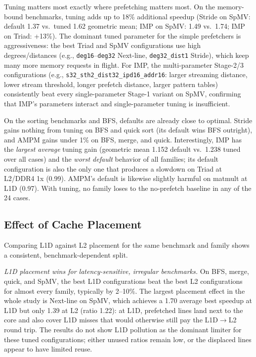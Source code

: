 \documentclass[12pt, letterpaper]{article}
\begin{document}
\noindent Tuning matters most exactly where prefetching matters most. On the memory-bound benchmarks, tuning adds up to 18\% additional speedup (Stride on SpMV: default 1.37 vs.\ tuned 1.62 geometric mean; IMP on SpMV: 1.49 vs.\ 1.74; IMP on Triad: +13\%). The dominant tuned parameter for the simple prefetchers is aggressiveness: the best Triad and SpMV configurations use high degrees/distances (e.g., \texttt{deg16}--\texttt{deg32} Next-line, \texttt{deg32\_dist1} Stride), which keep many more memory requests in flight. For IMP, the multi-parameter Stage-2/3 configurations (e.g., \texttt{s32\_sth2\_dist32\_ipd16\_addr16}: larger streaming distance, lower stream threshold, longer prefetch distance, larger pattern tables) consistently beat every single-parameter Stage-1 variant on SpMV, confirming that IMP's parameters interact and single-parameter tuning is insufficient.

\noindent On the sorting benchmarks and BFS, defaults are already close to optimal. Stride gains nothing from tuning on BFS and quick sort (its default wins BFS outright), and AMPM gains under 1\% on BFS, merge, and quick. Interestingly, IMP has the \emph{largest average} tuning gain (geometric mean 1.152 default vs.\ 1.238 tuned over all cases) and the \emph{worst default} behavior of all families; its default configuration is also the only one that produces a slowdown on Triad at L2/DDR4 1x (0.99). AMPM's default is likewise slightly harmful on matmult at L1D (0.97). With tuning, no family loses to the no-prefetch baseline in any of the 24 cases.

\subsection{Effect of Cache Placement}
\label{sec:res:cache-placement}

Comparing L1D against L2 placement for the same benchmark and family shows a consistent, benchmark-dependent split.

\noindent \emph{L1D placement wins for latency-sensitive, irregular benchmarks.} On BFS, merge, quick, and SpMV, the best L1D configurations beat the best L2 configurations for almost every family, typically by 2--10\%. The largest placement effect in the whole study is Next-line on SpMV, which achieves a 1.70 average best speedup at L1D but only 1.39 at L2 (ratio 1.22): at L1D, prefetched lines land next to the core and also cover L1D misses that would otherwise still pay the L1D$\rightarrow$L2 round trip. The results do not show L1D pollution as the dominant limiter for these tuned configurations; either unused ratios remain low, or the displaced lines appear to have limited reuse.
\end{document}
